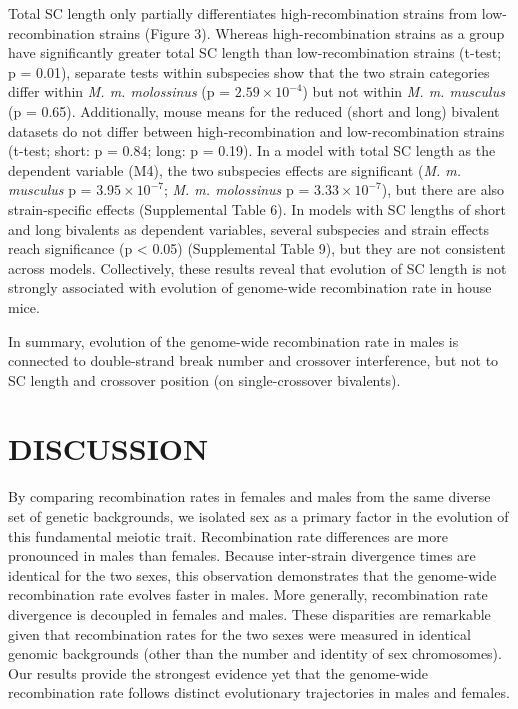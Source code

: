 \documentclass[
]{article}
\begin{document}
Total SC length only partially differentiates high-recombination strains
from low-recombination strains (Figure 3). Whereas high-recombination
strains as a group have significantly greater total SC length than
low-recombination strains (t-test; p = 0.01), separate tests within
subspecies show that the two strain categories differ within \emph{M. m.
molossinus} (p = \ensuremath{2.59\times 10^{-4}}) but not within
\emph{M. m. musculus} (p = 0.65). Additionally, mouse means for the
reduced (short and long) bivalent datasets do not differ between
high-recombination and low-recombination strains (t-test; short: p =
0.84; long: p = 0.19). In a model with total SC length as the dependent
variable (M4), the two subspecies effects are significant (\emph{M. m.
musculus} p = \ensuremath{3.95\times 10^{-7}}; \emph{M. m. molossinus} p
= \ensuremath{3.33\times 10^{-7}}), but there are also strain-specific
effects (Supplemental Table 6). In models with SC lengths of short and
long bivalents as dependent variables, several subspecies and strain
effects reach significance (p \textless{} 0.05) (Supplemental Table 9),
but they are not consistent across models. Collectively, these results
reveal that evolution of SC length is not strongly associated with
evolution of genome-wide recombination rate in house mice.

In summary, evolution of the genome-wide recombination rate in males is
connected to double-strand break number and crossover interference, but
not to SC length and crossover position (on single-crossover bivalents).

\hypertarget{discussion}{%
\section{DISCUSSION}\label{discussion}}

By comparing recombination rates in females and males from the same
diverse set of genetic backgrounds, we isolated sex as a primary factor
in the evolution of this fundamental meiotic trait. Recombination rate
differences are more pronounced in males than females. Because
inter-strain divergence times are identical for the two sexes, this
observation demonstrates that the genome-wide recombination rate evolves
faster in males. More generally, recombination rate divergence is
decoupled in females and males. These disparities are remarkable given
that recombination rates for the two sexes were measured in identical
genomic backgrounds (other than the number and identity of sex
chromosomes). Our results provide the strongest evidence yet that the
genome-wide recombination rate follows distinct evolutionary
trajectories in males and females.
\end{document}
